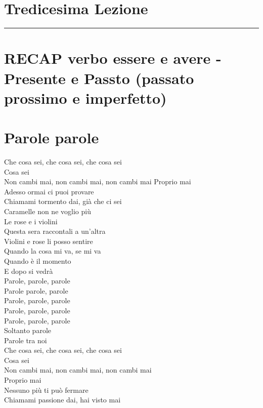 \documentclass[letter,11pt]{article}
\begin{document}
\section*{\Large{Tredicesima Lezione}}
\noindent\rule{16cm}{1pt}

\setlength{\parindent}{260pt}

\section*{RECAP verbo essere e avere - Presente e Passto (passato prossimo e imperfetto)}

\vskip 0.1in
\section*{Parole parole}
\vskip 0.1in
\begin{multicols}{2}

\noindent Che cosa sei, che cosa sei, che cosa sei \\
Cosa sei \\
Non cambi mai, non cambi mai, non cambi mai
Proprio mai \\
Adesso ormai ci puoi provare  \\
Chiamami tormento dai, già che ci sei \\
Caramelle non ne voglio più \\

\noindent Le rose e i violini \\
Questa sera raccontali a un'altra \\
Violini e rose li posso sentire \\
Quando la cosa mi va, se mi va \\
Quando è il momento \\
E dopo si vedrà \\

\noindent Parole, parole, parole \\
Parole parole, parole \\
Parole, parole, parole \\
Parole, parole, parole \\
Parole, parole, parole \\
Soltanto parole \\
Parole tra noi \\

\noindent Che cosa sei, che cosa sei, che cosa sei \\
Cosa sei \\
Non cambi mai, non cambi mai, non cambi mai \\
Proprio mai \\
Nessuno più ti può fermare \\
Chiamami passione dai, hai visto mai \\


\end{multicols}
\end{document}
